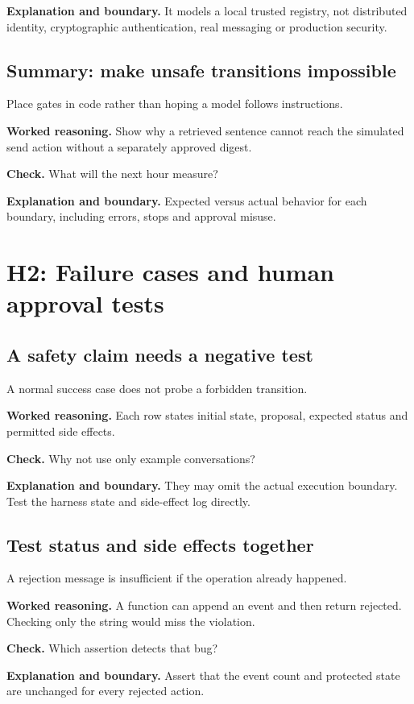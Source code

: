 \textbf{Explanation and boundary.} It models a local trusted registry, not distributed identity, cryptographic authentication, real messaging or production security.

\subsection{Summary: make unsafe transitions impossible}
Place gates in code rather than hoping a model follows instructions.

\textbf{Worked reasoning.} Show why a retrieved sentence cannot reach the simulated send action without a separately approved digest.

\textbf{Check.} What will the next hour measure?

\textbf{Explanation and boundary.} Expected versus actual behavior for each boundary, including errors, stops and approval misuse.

\section{H2: Failure cases and human approval tests}
\subsection{A safety claim needs a negative test}
A normal success case does not probe a forbidden transition.

\textbf{Worked reasoning.} Each row states initial state, proposal, expected status and permitted side effects.

\textbf{Check.} Why not use only example conversations?

\textbf{Explanation and boundary.} They may omit the actual execution boundary. Test the harness state and side-effect log directly.

\subsection{Test status and side effects together}
A rejection message is insufficient if the operation already happened.

\textbf{Worked reasoning.} A function can append an event and then return rejected. Checking only the string would miss the violation.

\textbf{Check.} Which assertion detects that bug?

\textbf{Explanation and boundary.} Assert that the event count and protected state are unchanged for every rejected action.

